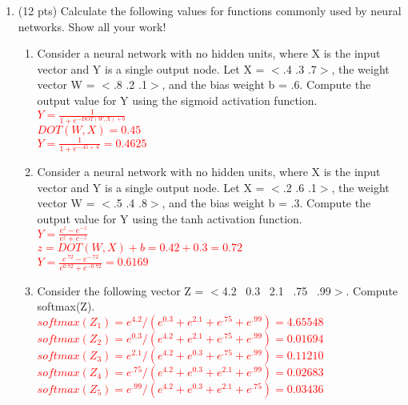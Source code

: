 \documentclass[11pt]{article}
\begin{document}
\begin{enumerate}
\begin{enumerate}
\end{enumerate}


\newpage

\item (12 pts) Calculate the following values for functions commonly used
  by neural networks. Show all your work!

\begin{enumerate}

\item Consider a neural network with no hidden units, where X is
  the input vector and Y is a single output node. Let X = $<$.4 .3 .7$>$, the
  weight vector W = $<$.8 .2 .1$>$, and the bias weight b = .6.
  Compute the output value for Y using the sigmoid activation
  function. \\
  \textcolor{red}{
  $ Y = \frac{1}{1+e^{-DOT(W,X)+b}}$\\
  $DOT(W,X) = 0.45$\\
  $ Y = \frac{1}{1+e^{-.45+.6}}= 0.4625$\\}

\item Consider a neural network with no hidden units, where X is
  the input vector and Y is a single output node. Let X = $<$.2 .6 .1$>$, the
  weight vector W = $<$.5 .4 .8$>$, and the bias weight b = .3.
  Compute the output value for Y using the tanh activation
  function. \\
  \textcolor{red}{
  $ Y = \frac{e^z-e^{-z}}{e^z+e^{-z}}$\\
  $ z = DOT(W,X)+b = 0.42 +0.3 = 0.72$\\
  $ Y = \frac{e^{.72}-e^{-.72}}{e^{0.72}+e^{-0.72}}= 0.6169$\\}


\item Consider the following vector Z = $<$4.2 ~0.3 ~2.1 ~.75 ~.99$>$. 
Compute softmax(Z).  \\
\textcolor{red}{
$softmax(Z_1) = e^{4.2} / (e^{0.3} + e^{2.1} + e^{.75} + e^{.99}) = 4.65548$\\
$softmax(Z_2) = e^{0.3} / (e^{4.2} + e^{2.1} + e^{.75} + e^{.99}) = 0.01694$\\
$softmax(Z_3) = e^{2.1} / (e^{4.2} + e^{0.3} + e^{.75} + e^{.99}) = 0.11210$\\
$softmax(Z_4) = e^{.75} / (e^{4.2} + e^{0.3} + e^{2.1} + e^{.99}) = 0.02683$\\
$softmax(Z_5) = e^{.99} / (e^{4.2} + e^{0.3} + e^{2.1} + e^{.75}) = 0.03436$\\}



\end{enumerate}
\end{enumerate}
\end{document}
